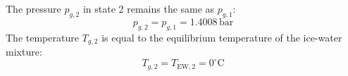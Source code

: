 The pressure \( p_{g,2} \) in state 2 remains the same as \( p_{g,1} \):  
\[
p_{g,2} = p_{g,1} = 1.4008 \, \text{bar}
\]  
The temperature \( T_{g,2} \) is equal to the equilibrium temperature of the ice-water mixture:  
\[
T_{g,2} = T_{\text{EW},2} = 0^\circ\text{C}
\]
